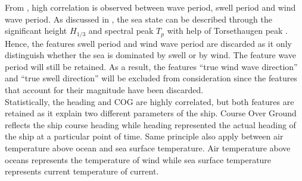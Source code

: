 From , high correlation is observed between wave period, swell period and wind wave period. As discussed in , the sea state can be described through the significant height $H_{1/3}$ and spectral peak $T_p$ with help of Torsethaugen peak . Hence, the features swell period and wind wave period are discarded as it only distinguish whether the sea is dominated by swell or by wind. The feature wave period will still be retained. As a result, the features ``true wind wave direction'' and ``true swell direction'' will be excluded from consideration since the features that account for their magnitude have been discarded.\\

Statistically, the heading and COG are highly correlated, but both features are retained as it explain two different parameters of the ship. Course Over Ground reflects the ship course heading while heading represented the actual heading of the ship at a particular point of time. Same principle also apply between air temperature above ocean and sea surface temperature. Air temperature above oceans represents the temperature of wind while sea surface temperature represents current temperature of current.\\

